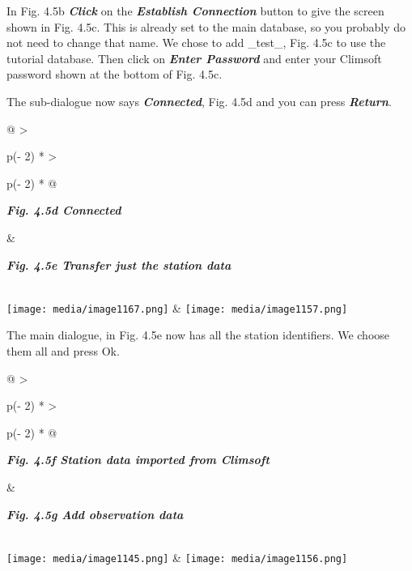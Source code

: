 \documentclass[
  letterpaper,
  DIV=11,
  numbers=noendperiod]{scrreprt}
\begin{document}
In Fig. 4.5b \textbf{\emph{Click}} on the \textbf{\emph{Establish
Connection}} button to give the screen shown in Fig. 4.5c. This is
already set to the main database, so you probably do not need to change
that name. We chose to add \_test\_, Fig. 4.5c to use the tutorial
database. Then click on \textbf{\emph{Enter Password}} and enter your
Climsoft password shown at the bottom of Fig. 4.5c.

The sub-dialogue now says \textbf{\emph{Connected}}, Fig. 4.5d and you
can press \textbf{\emph{Return}}.

\begin{longtable}[]{@{}
  >{\raggedright\arraybackslash}p{(\columnwidth - 2\tabcolsep) * }
  >{\raggedright\arraybackslash}p{(\columnwidth - 2\tabcolsep) * }@{}}
\toprule\noalign{}
\begin{minipage}[b]{\linewidth}\raggedright
\textbf{\emph{Fig. 4.5d Connected}}
\end{minipage} & \begin{minipage}[b]{\linewidth}\raggedright
\textbf{\emph{Fig. 4.5e Transfer just the station data}}
\end{minipage} \\
\midrule\noalign{}
\endhead
\bottomrule\noalign{}
\endlastfoot
\texttt{[image: media/image1167.png]}
&
\texttt{[image: media/image1157.png]} \\
\end{longtable}

The main dialogue, in Fig. 4.5e now has all the station identifiers. We
choose them all and press Ok.

\begin{longtable}[]{@{}
  >{\raggedright\arraybackslash}p{(\columnwidth - 2\tabcolsep) * }
  >{\raggedright\arraybackslash}p{(\columnwidth - 2\tabcolsep) * }@{}}
\toprule\noalign{}
\begin{minipage}[b]{\linewidth}\raggedright
\textbf{\emph{Fig. 4.5f Station data imported from Climsoft}}
\end{minipage} & \begin{minipage}[b]{\linewidth}\raggedright
\textbf{\emph{Fig. 4.5g Add observation data}}
\end{minipage} \\
\midrule\noalign{}
\endhead
\bottomrule\noalign{}
\endlastfoot
\texttt{[image: media/image1145.png]}
&
\texttt{[image: media/image1156.png]} \\
\end{longtable}
\end{document}
